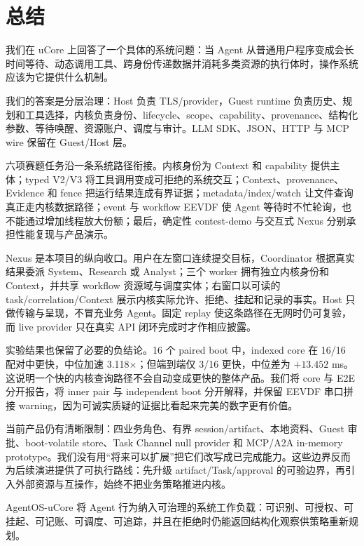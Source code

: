 \chapter{总结}
\label{chap:conclusion}

我们在 uCore 上回答了一个具体的系统问题：当 Agent 从普通用户程序变成会长时间等待、动态调用工具、跨身份传递数据并消耗多类资源的执行体时，操作系统应该为它提供什么机制。

我们的答案是分层治理：Host 负责 TLS/provider，Guest runtime 负责历史、规划和工具选择，内核负责身份、lifecycle、scope、capability、provenance、结构化参数、等待唤醒、资源账户、调度与审计。LLM SDK、JSON、HTTP 与 MCP wire 保留在 Guest/Host 层。

六项赛题任务沿一条系统路径衔接。内核身份为 Context 和 capability 提供主体；typed V2/V3 将工具调用变成可拒绝的系统交互；Context、provenance、Evidence 和 fence 把运行结果连成有界证据；metadata/index/watch 让文件查询真正走内核数据路径；event 与 workflow EEVDF 使 Agent 等待时不忙轮询，也不能通过增加线程放大份额；最后，确定性 contest-demo 与交互式 Nexus 分别承担性能复现与产品演示。

Nexus 是本项目的纵向收口。用户在左窗口连续提交目标，Coordinator 根据真实结果委派 System、Research 或 Analyst；三个 worker 拥有独立内核身份和 Context，并共享 workflow 资源域与调度实体；右窗口以可读的 task/correlation/Context 展示内核实际允许、拒绝、挂起和记录的事实。Host 只做传输与呈现，不冒充业务 Agent。固定 replay 使这条路径在无网时仍可复验，而 live provider 只在真实 API 闭环完成时才作相应披露。

实验结果也保留了必要的负结论。16 个 paired boot 中，indexed core 在 16/16 配对中更快，中位加速 3.118$\times$；但端到端仅 3/16 更快，中位差为 $+13.452$ ms。这说明一个快的内核查询路径不会自动变成更快的整体产品。我们将 core 与 E2E 分开报告，将 inner pair 与 independent boot 分开解释，并保留 EEVDF 串口拼接 warning，因为可诚实质疑的证据比看起来完美的数字更有价值。

当前产品仍有清晰限制：四业务角色、有界 session/artifact、本地资料、Guest 审批、boot-volatile store、Task Channel null provider 和 MCP/A2A in-memory prototype。我们没有用“将来可以扩展”把它们改写成已完成能力。这些边界反而为后续演进提供了可执行路线：先升级 artifact/Task/approval 的可验边界，再引入外部资源与互操作，始终不把业务策略推进内核。

\begin{evidencebox}[最终结论]
AgentOS-uCore 将 Agent 行为纳入可治理的系统工作负载：可识别、可授权、可挂起、可记账、可调度、可追踪，并且在拒绝时仍能返回结构化观察供策略重新规划。
\end{evidencebox}
